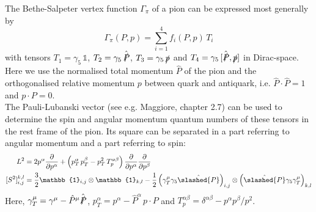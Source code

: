 

	The Bethe-Salpeter vertex function $\Gamma_\pi$ of a pion can be expressed most generally by
	\begin{equation}
		\Gamma_\pi (P,p) =  \sum_{i=1}^4 f_i(P,p) \,T_i
	\end{equation}
	with tensors $T_1 = \gamma_5\,\mathbb{1}$, $T_2 = \gamma_5\,\hat{\slashed{P}}$, $T_3 = \gamma_5\,{\slashed{p}}$ and $T_4 = \gamma_5\,[\hat{\slashed{P}} ,{\slashed{p}}]$ in Dirac-space. 
	Here we use the normalised total momentum $\hat{P}$ of the pion and the orthogonalised relative momentum $p$ between quark and antiquark, 
	i.e. $\hat{P}\cdot \hat{P} = 1$ and $p\cdot P=0$.\\
	The Pauli-Lubanski vector (see e.g. Maggiore, chapter 2.7) can be used to determine the spin and angular momentum quantum numbers of these tensors in the rest frame of the pion. Its square can be separated in a part referring to angular momentum and a part referring to spin:
	\begin{align}
        L^2 &= 2 p^\alpha \frac{\partial}{\partial p^\alpha} + \left( p_T^\alpha \,p_T^\beta - p_T^2 \,T_p^{\alpha \beta} \right)\frac{\partial}{\partial p^\alpha} \frac{\partial}{\partial p^\beta} \\
        [S^2]_{i,j}^{k,l} &= \frac{3}{2} \mathbb{1}_{i,j} \otimes \mathbb{1}_{k,l} - \frac{1}{2} \left(\gamma_T^\mu \gamma_5 \hat{\slashed{P}} \right)_{i,j} \otimes \left(\hat{\slashed{P}} \gamma_5  \gamma_T^\mu \right)_{k,l}
	\end{align}	
	Here, $\gamma_T^\mu = \gamma^\mu - \hat{P}^\mu \hat{\slashed{P}}$, $p_T^\alpha = p^\alpha -\hat{P}^\alpha \,p \cdot P$ and
	$T_p^{\alpha \beta} = \delta^{\alpha \beta} - p^\alpha p^\beta /p^2$.
	

